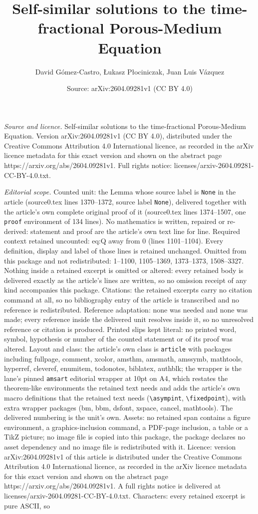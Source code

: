 \documentclass[10pt,a4paper]{amsart}
\title[Self-similar solutions to the time-fractional Porous-Medium ]{Self-similar solutions to the time-fractional Porous-Medium Equation}
\author{David G\'omez-Castro, {\L}ukasz P{\l}ociniczak, Juan Luis V\'azquez}
\date{Source: arXiv:2604.09281v1 (CC BY 4.0)}
\begin{document}
\maketitle

\noindent\emph{Source and licence.} Self-similar solutions to the time-fractional Porous-Medium Equation. Version arXiv:2604.09281v1 (CC BY 4.0), distributed under the Creative Commons Attribution 4.0 International licence, as recorded in the arXiv licence metadata for this exact version and shown on the abstract page https://arxiv.org/abs/2604.09281v1. Full rights notice: licenses/arxiv-2604.09281-CC-BY-4.0.txt.\par\smallskip

\noindent\textit{Editorial scope.} Counted unit: the Lemma whose source label is \texttt{None} in the article (source0.tex lines 1370--1372, source label \texttt{None}), delivered together with the article's own complete original proof of it (source0.tex lines 1374--1507, one \texttt{proof} environment of 134 lines). No mathematics is written, repaired or re-derived: statement and proof are the article's own text line for line. Required context retained uncounted: eq:Q away from 0 (lines 1101--1104). Every definition, display and label of those lines is retained unchanged. Omitted from this package and not redistributed: 1--1100, 1105--1369, 1373--1373, 1508--3327. Nothing inside a retained excerpt is omitted or altered: every retained body is delivered exactly as the article's lines are written, so no omission receipt of any kind accompanies this package. Citations: the retained excerpts carry no citation command at all, so no bibliography entry of the article is transcribed and no reference is redistributed. Reference adaptation: none was needed and none was made; every reference inside the delivered unit resolves inside it, so no unresolved reference or citation is produced. Printed slips kept literal: no printed word, symbol, hypothesis or number of the counted statement or of its proof was altered. Layout and class: the article's own class is \texttt{article} with packages including fullpage, comment, xcolor, amsthm, amsmath, amssymb, mathtools, hyperref, cleveref, enumitem, todonotes, biblatex, authblk; the wrapper is the lane's pinned \texttt{amsart} editorial wrapper at 10pt on A4, which restates the theorem-like environments the retained text needs and adds the article's own macro definitions that the retained text needs (\texttt{\textbackslash asympint}, \texttt{\textbackslash fixedpoint}), with extra wrapper packages (bm, bbm, dsfont, xspace, cancel, mathtools). The delivered numbering is the unit's own. Assets: no retained span contains a figure environment, a graphics-inclusion command, a PDF-page inclusion, a table or a TikZ picture; no image file is copied into this package, the package declares no asset dependency and no image file is redistributed with it. Licence: version arXiv:2604.09281v1 of this article is distributed under the Creative Commons Attribution 4.0 International licence, as recorded in the arXiv licence metadata for this exact version and shown on the abstract page https://arxiv.org/abs/2604.09281v1. A full rights notice is delivered at licenses/arxiv-2604.09281-CC-BY-4.0.txt. Characters: every retained excerpt is pure ASCII, so 
\end{document}
